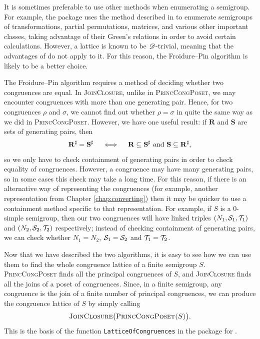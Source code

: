 It is sometimes preferable to use other methods when enumerating a semigroup.
For example, the \Semigroups{} package uses the method described in
\cite{computing_finite_semigroups} to enumerate semigroups of transformations,
partial permutations, matrices, and various other important classes, taking
advantage of their Green's relations in order to avoid certain calculations.
However, a lattice is known to be $\mathscr{D}$-trivial, meaning that the advantages of
\cite{computing_finite_semigroups} do not apply to it.  For this reason, the
Froidure--Pin algorithm is likely to be a better choice.

The Froidure--Pin algorithm requires a method of deciding whether two
congruences are equal.  In \textsc{JoinClosure}, unlike in
\textsc{PrincCongPoset}, we may encounter congruences with more than one
generating pair.  Hence, for two congruences $\rho$ and $\sigma$, we cannot find
out whether $\rho = \sigma$ in quite the same way as we did in
\textsc{PrincCongPoset}.  However, we have one useful result: if $\mathbf{R}$
and $\mathbf{S}$ are sets of generating pairs, then
$$\mathbf{R}^\sharp = \mathbf{S}^\sharp \quad\iff\quad
\mathbf{R} \subseteq \mathbf{S}^\sharp \textnormal{~and~}
\mathbf{S} \subseteq \mathbf{R}^\sharp,$$
so we only have to check containment of generating pairs in order to check
equality of congruences.  However, a congruence may have many generating pairs,
so in some cases this check may take a long time.  For this reason, if there is
an alternative way of representing the congruences (for example, another
representation from Chapter \ref{chap:converting}) then it may be quicker to use
a containment method specific to that representation.  For example, if $S$ is a
0-simple semigroup, then our two congruences will have linked triples
$(N_1,\mathcal{S}_1,\mathcal{T}_1)$ and $(N_2,\mathcal{S}_2,\mathcal{T}_2)$ respectively; instead of checking
containment of generating pairs, we can check whether $N_1 = N_2$,
$\mathcal{S}_1 = \mathcal{S}_2$ and $\mathcal{T}_1 = \mathcal{T}_2$.

Now that we have described the two algorithms, it is easy to see how we can use
them to find the whole congruence lattice of a finite semigroup $S$.
\textsc{PrincCongPoset} finds all the principal congruences of $S$, and
\textsc{JoinClosure} finds all the joins of a poset of congruences.  Since, in a
finite semigroup, any congruence is the join of a finite number of principal
congruences, we can produce the congruence lattice of $S$ by simply calling
$$\textsc{JoinClosure\big(PrincCongPoset($S$)\big)}.$$  This is the basis of the
function \texttt{LatticeOfCongruences} in the \Semigroups{} package for \GAP{}
\cite{semigroups}.

